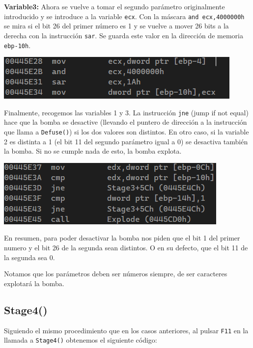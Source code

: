 \documentclass[11pt,a4paper]{article}
\begin{document}
\vspace{4mm}
\textbf{Variable3:} Ahora se vuelve a tomar el segundo parámetro originalmente introducido y se
introduce a la variable \texttt{ecx}. Con la máscara \texttt{and ecx,4000000h} se mira si el bit 26 del primer
número es 1 y se vuelve a mover 26 bits a la derecha con la instrucción \texttt{sar}. Se guarda este valor
en la dirección de memoria \texttt{ebp-10h}.
\begin{center}
  \includegraphics[width=\textwidth]{Stage3/img5.png}
\end{center}

Finalmente, recogemos las variables 1 y 3. La instrucción \texttt{jne} (jump if not equal) hace que la bomba se desactive
(llevando el puntero de dirección a la instrucción que llama a \texttt{Defuse()}) si los dos valores son distintos.
En otro caso, si la variable 2 es distinta a 1 (el bit 11 del segundo parámetro igual a 0) se desactiva también la bomba.
Si no se cumple nada de esto, la bomba explota.

\begin{center}
  \includegraphics[width=\textwidth]{Stage3/img6.png}
\end{center}

En resumen, para poder desactivar la bomba nos piden que el bit 1 del primer numero y el bit 26 de la segunda sean distintos.
O en su defecto, que el bit 11 de la segunda sea 0.

Notamos que los parámetros deben ser números siempre, de ser caracteres explotará la bomba.

\newpage
\subsection{Stage4()}
Siguiendo el mismo procedimiento que en los casos anteriores, al pulsar \texttt{F11} en la
llamada a \texttt{Stage4()} obtenemos el siguiente código:
\end{document}
